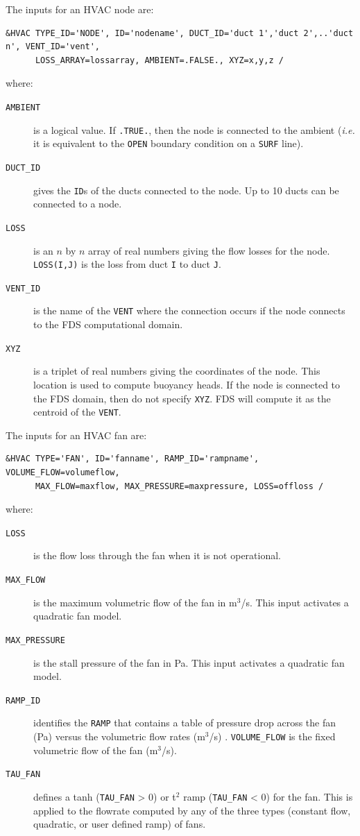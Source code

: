 \documentclass[11pt]{book}
\newcommand{\ct}{\tt\small}
\begin{document}
\noindent
The inputs for an HVAC node are:

\footnotesize
\begin{verbatim}
&HVAC TYPE_ID='NODE', ID='nodename', DUCT_ID='duct 1','duct 2',..'duct n', VENT_ID='vent',
      LOSS_ARRAY=lossarray, AMBIENT=.FALSE., XYZ=x,y,z /
\end{verbatim}\normalsize

\noindent
where:

\begin{description}
\item[{\ct AMBIENT}] is a logical value.  If {\ct .TRUE.}, then the node is connected to the ambient ({\em i.e.} it is equivalent to the {\ct OPEN} boundary condition on a {\ct SURF} line).
\item[{\ct DUCT\_ID}] gives the {\ct ID}s of the ducts connected to the node.  Up to 10 ducts can be connected to a node.
\item[{\ct LOSS}] is an $n$ by $n$ array of real numbers giving the flow losses for the node.  {\ct LOSS(I,J)} is the loss from duct {\ct I} to duct {\ct J}.
\item[{\ct VENT\_ID}] is the name of the {\ct VENT} where the connection occurs if the node connects to the FDS computational domain.
\item[{\ct XYZ}] is a triplet of real numbers giving the coordinates of the node.  This location is used to compute buoyancy heads.
If the node is connected to the FDS domain, then do not specify {\ct XYZ}.  FDS will compute it as the centroid of the {\ct VENT}.
\end{description}

\noindent
The inputs for an HVAC fan are:

\footnotesize
\begin{verbatim}
&HVAC TYPE='FAN', ID='fanname', RAMP_ID='rampname', VOLUME_FLOW=volumeflow,
      MAX_FLOW=maxflow, MAX_PRESSURE=maxpressure, LOSS=offloss /
\end{verbatim}\normalsize

\noindent
where:

\begin{description}
\item[{\ct LOSS}] is the flow loss through the fan when it is not operational.
\item[{\ct MAX\_FLOW}] is the maximum volumetric flow of the fan in m$^3$/s.  This input activates a quadratic fan model.
\item[{\ct MAX\_PRESSURE}] is the stall pressure of the fan in Pa.  This input activates a quadratic fan model.
\item[{\ct RAMP\_ID}] identifies the {\ct RAMP} that contains a table of pressure drop across the fan (Pa) versus the volumetric flow rates (m$^3$/s) .
{\ct VOLUME\_FLOW} is the fixed volumetric flow of the fan (m$^3$/s).
\item[{\ct TAU\_FAN}]  defines a tanh ({\ct TAU\_FAN} > 0) or t$^2$ ramp ({\ct TAU\_FAN} < 0) for the fan.  This is applied to the flowrate computed by any of the three types (constant flow, quadratic, or user defined ramp) of fans.
\end{description}
\end{document}
